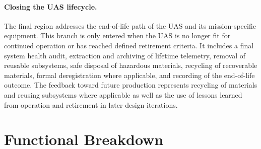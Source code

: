 \paragraph{Closing the UAS lifecycle.}
The final region addresses the end-of-life path of the UAS and its mission-specific equipment. This branch is only entered when the UAS is no longer fit for continued operation or has reached defined retirement criteria. It includes a final system health audit, extraction and archiving of lifetime telemetry, removal of reusable subsystems, safe disposal of hazardous materials, recycling of recoverable materials, formal deregistration where applicable, and recording of the end-of-life outcome. The feedback toward future production represents recycling of materials and reusing subsystems where applicable as well as the use of lessons learned from operation and retirement in later design iterations.
                               
\section{Functional Breakdown}

\label{sec:functional_breakdown_structure}

